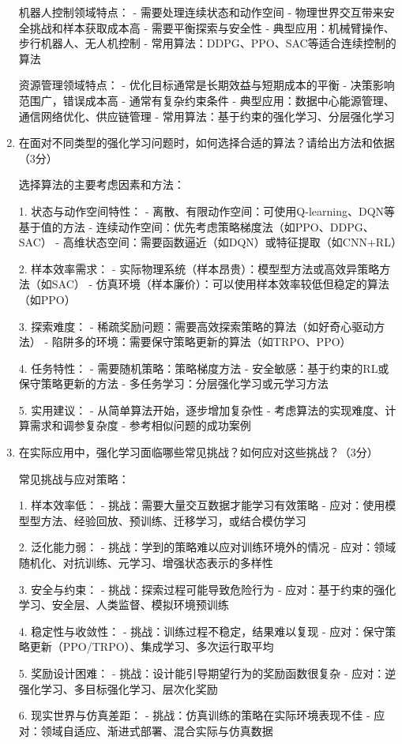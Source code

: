 \documentclass[zihao=5,answers]{BHCexam}
\begin{document}
\begin{questions}
\begin{solution}
\begin{enumerate}
    机器人控制领域特点：
    - 需要处理连续状态和动作空间
    - 物理世界交互带来安全挑战和样本获取成本高
    - 需要平衡探索与安全性
    - 典型应用：机械臂操作、步行机器人、无人机控制
    - 常用算法：DDPG、PPO、SAC等适合连续控制的算法
    
    资源管理领域特点：
    - 优化目标通常是长期效益与短期成本的平衡
    - 决策影响范围广，错误成本高
    - 通常有复杂约束条件
    - 典型应用：数据中心能源管理、通信网络优化、供应链管理
    - 常用算法：基于约束的强化学习、分层强化学习
    
    \item 在面对不同类型的强化学习问题时，如何选择合适的算法？请给出方法和依据（3分）
    
    选择算法的主要考虑因素和方法：
    
    1. 状态与动作空间特性：
       - 离散、有限动作空间：可使用Q-learning、DQN等基于值的方法
       - 连续动作空间：优先考虑策略梯度法（如PPO、DDPG、SAC）
       - 高维状态空间：需要函数逼近（如DQN）或特征提取（如CNN+RL）
    
    2. 样本效率需求：
       - 实际物理系统（样本昂贵）：模型型方法或高效异策略方法（如SAC）
       - 仿真环境（样本廉价）：可以使用样本效率较低但稳定的算法（如PPO）
    
    3. 探索难度：
       - 稀疏奖励问题：需要高效探索策略的算法（如好奇心驱动方法）
       - 陷阱多的环境：需要保守策略更新的算法（如TRPO、PPO）
    
    4. 任务特性：
       - 需要随机策略：策略梯度方法
       - 安全敏感：基于约束的RL或保守策略更新的方法
       - 多任务学习：分层强化学习或元学习方法
    
    5. 实用建议：
       - 从简单算法开始，逐步增加复杂性
       - 考虑算法的实现难度、计算需求和调参复杂度
       - 参考相似问题的成功案例
    
    \item 在实际应用中，强化学习面临哪些常见挑战？如何应对这些挑战？（3分）
    
    常见挑战与应对策略：
    
    1. 样本效率低：
       - 挑战：需要大量交互数据才能学习有效策略
       - 应对：使用模型型方法、经验回放、预训练、迁移学习，或结合模仿学习
    
    2. 泛化能力弱：
       - 挑战：学到的策略难以应对训练环境外的情况
       - 应对：领域随机化、对抗训练、元学习、增强状态表示的多样性
    
    3. 安全与约束：
       - 挑战：探索过程可能导致危险行为
       - 应对：基于约束的强化学习、安全层、人类监督、模拟环境预训练
    
    4. 稳定性与收敛性：
       - 挑战：训练过程不稳定，结果难以复现
       - 应对：保守策略更新（PPO/TRPO）、集成学习、多次运行取平均
    
    5. 奖励设计困难：
       - 挑战：设计能引导期望行为的奖励函数很复杂
       - 应对：逆强化学习、多目标强化学习、层次化奖励
    
    6. 现实世界与仿真差距：
       - 挑战：仿真训练的策略在实际环境表现不佳
       - 应对：领域自适应、渐进式部署、混合实际与仿真数据
\end{enumerate}
\end{solution}

\end{questions}
\end{document}
